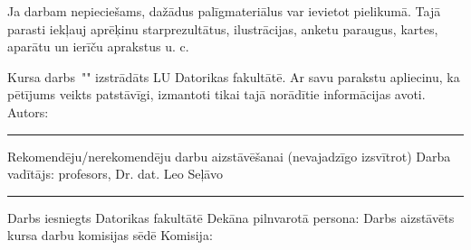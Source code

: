 \documentclass[12pt]{report}%
\theoremstyle{definition}
\def\degree{Kursa darbs}
\def\supervisor{Darba vadītājs: profesors, Dr. dat. Leo Seļāvo}
\begin{document}
Ja darbam nepieciešams, dažādus palīgmateriālus var ievietot pielikumā. Tajā
parasti iekļauj aprēķinu starprezultātus, ilustrācijas, anketu paraugus, kartes, aparātu un ierīču
aprakstus u. c.


\newpage
\thispagestyle{empty}
\makeatletter
{
\noindent
\degree \ "\@title" izstrādāts LU Datorikas fakultātē.
\newline
\newline
\noindent
Ar savu parakstu apliecinu, ka pētījums veikts patstāvīgi, izmantoti tikai tajā norādītie informācijas avoti.
\newline
\newline
\noindent
Autors: \@author \space \rule{30mm}{0.2mm}
\newline
\newline
\newline
\noindent
Rekomendēju/nerekomendēju darbu aizstāvēšanai (nevajadzīgo izsvītrot)
\newline
\newline
\noindent 
\supervisor \space \rule{30mm}{0.2mm}
\newline
\newline
\newline
\newline
\newline
\noindent 
Darbs iesniegts Datorikas fakultātē
\newline
\newline
\noindent 
Dekāna pilnvarotā persona:
\newline
\newline
\newline
\newline
\noindent 
Darbs aizstāvēts kursa darbu komisijas sēdē
\newline
\newline
\newline
\newline
\newline
\noindent 
Komisija:
}
\makeatother
\end{document}
